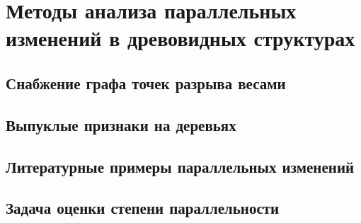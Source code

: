 \section{Методы анализа параллельных изменений в древовидных структурах}
\label{sec:dirichlet_model}

\subsection{Снабжение графа точек разрыва весами}
\label{subsec:breakpoint_weights}

\subsection{Выпуклые признаки на деревьях}
\label{subsec:modified_dcj}

\subsection{Литературные примеры параллельных изменений}
\label{subsec:parallel_changes_examples}

\subsection{Задача оценки степени параллельности}
\label{subsec:parallelism_estimation}
